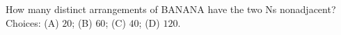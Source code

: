 How many distinct arrangements of BANANA have the two Ns nonadjacent? Choices: (A) $20$; (B) $60$; (C) $40$; (D) $120$.
